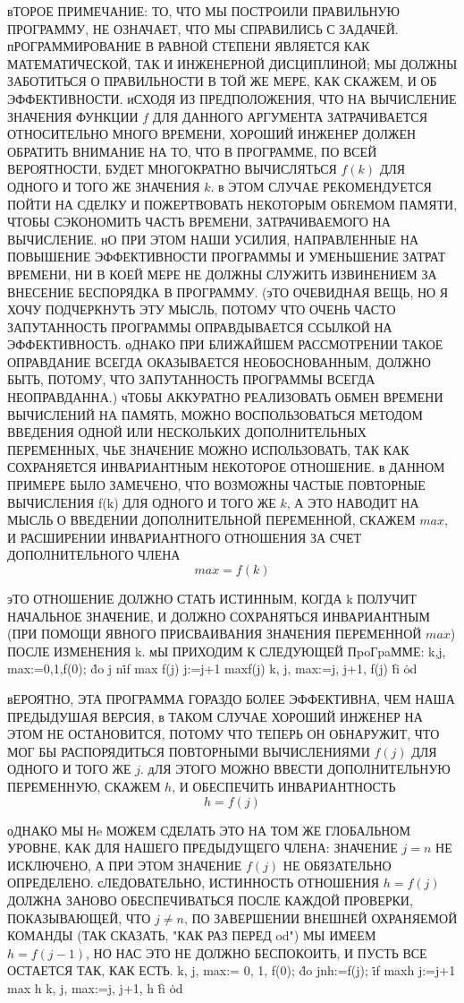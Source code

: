вТОРОЕ ПРИМЕЧАНИЕ: ТО, ЧТО МЫ ПОСТРОИЛИ ПРАВИЛЬНУЮ ПРОГРАММУ,
НЕ ОЗНАЧАЕТ, ЧТО МЫ СПРАВИЛИСЬ С ЗАДАЧЕЙ. пРОГРАММИРОВАНИЕ
В РАВНОЙ СТЕПЕНИ ЯВЛЯЕТСЯ КАК МАТЕМАТИЧЕСКОЙ, ТАК И ИНЖЕНЕРНОЙ
ДИСЦИПЛИНОЙ; МЫ ДОЛЖНЫ ЗАБОТИТЬСЯ О ПРАВИЛЬНОСТИ В ТОЙ
ЖЕ МЕРЕ, КАК СКАЖЕМ, И ОБ ЭФФЕКТИВНОСТИ. иСХОДЯ ИЗ
ПРЕДПОЛОЖЕНИЯ, ЧТО НА ВЫЧИСЛЕНИЕ ЗНАЧЕНИЯ ФУНКЦИИ $f$ 
ДЛЯ ДАННОГО АРГУМЕНТА ЗАТРАЧИВАЕТСЯ ОТНОСИТЕЛЬНО МНОГО ВРЕМЕНИ,
ХОРОШИЙ ИНЖЕНЕР ДОЛЖЕН ОБРАТИТЬ ВНИМАНИЕ НА ТО, ЧТО В
ПРОГРАММЕ, ПО ВСЕЙ ВЕРОЯТНОСТИ, БУДЕТ МНОГОКРАТНО ВЫЧИСЛЯТЬСЯ
$f(k)$ ДЛЯ ОДНОГО И ТОГО ЖЕ ЗНАЧЕНИЯ $k$. в ЭТОМ СЛУЧАЕ
РЕКОМЕНДУЕТСЯ ПОЙТИ НА СДЕЛКУ И ПОЖЕРТВОВАТЬ НЕКОТОРЫМ
ОБRЕМОМ ПАМЯТИ, ЧТОБЫ СЭКОНОМИТЬ ЧАСТЬ ВРЕМЕНИ, ЗАТРАЧИВАЕМОГО
НА ВЫЧИСЛЕНИЕ. нО ПРИ ЭТОМ НАШИ УСИЛИЯ, НАПРАВЛЕННЫЕ НА
ПОВЫШЕНИЕ ЭФФЕКТИВНОСТИ ПРОГРАММЫ И УМЕНЬШЕНИЕ
ЗАТРАТ ВРЕМЕНИ, НИ В КОЕЙ МЕРЕ НЕ ДОЛЖНЫ СЛУЖИТЬ ИЗВИНЕНИЕМ
ЗА ВНЕСЕНИЕ БЕСПОРЯДКА В ПРОГРАММУ. (эТО ОЧЕВИДНАЯ ВЕЩЬ, НО Я ХОЧУ
ПОДЧЕРКНУТЬ ЭТУ МЫСЛЬ, ПОТОМУ ЧТО ОЧЕНЬ ЧАСТО
ЗАПУТАННОСТЬ ПРОГРАММЫ ОПРАВДЫВАЕТСЯ ССЫЛКОЙ НА
ЭФФЕКТИВНОСТЬ. оДНАКО ПРИ БЛИЖАЙШЕМ РАССМОТРЕНИИ ТАКОЕ
ОПРАВДАНИЕ ВСЕГДА ОКАЗЫВАЕТСЯ НЕОБОСНОВАННЫМ, ДОЛЖНО БЫТЬ,
ПОТОМУ, ЧТО ЗАПУТАННОСТЬ ПРОГРАММЫ ВСЕГДА НЕОПРАВДАННА.)
чТОБЫ АККУРАТНО РЕАЛИЗОВАТЬ ОБМЕН ВРЕМЕНИ ВЫЧИСЛЕНИЙ НА
ПАМЯТЬ, МОЖНО ВОСПОЛЬЗОВАТЬСЯ МЕТОДОМ ВВЕДЕНИЯ ОДНОЙ ИЛИ
НЕСКОЛЬКИХ ДОПОЛНИТЕЛЬНЫХ ПЕРЕМЕННЫХ, ЧЬЕ ЗНАЧЕНИЕ МОЖНО
ИСПОЛЬЗОВАТЬ, ТАК КАК СОХРАНЯЕТСЯ ИНВАРИАНТНЫМ НЕКОТОРОЕ
ОТНОШЕНИЕ. в ДАННОМ ПРИМЕРЕ БЫЛО ЗАМЕЧЕНО, ЧТО ВОЗМОЖНЫ
ЧАСТЫЕ ПОВТОРНЫЕ ВЫЧИСЛЕНИЯ f(k) ДЛЯ ОДНОГО И ТОГО ЖЕ $k$, 
А ЭТО НАВОДИТ НА МЫСЛЬ О ВВЕДЕНИИ ДОПОЛНИТЕЛЬНОЙ 
ПЕРЕМЕННОЙ, СКАЖЕМ $max$, И РАСШИРЕНИИ ИНВАРИАНТНОГО ОТНОШЕНИЯ
ЗА СЧЕТ ДОПОЛНИТЕЛЬНОГО ЧЛЕНА
$$
max=f(k)
$$

эТО ОТНОШЕНИЕ ДОЛЖНО СТАТЬ ИСТИННЫМ, КОГДА k  ПОЛУЧИТ
НАЧАЛЬНОЕ ЗНАЧЕНИЕ, И ДОЛЖНО СОХРАНЯТЬСЯ ИНВАРИАНТНЫМ (ПРИ
ПОМОЩИ ЯВНОГО ПРИСВАИВАНИЯ ЗНАЧЕНИЯ ПЕРЕМЕННОЙ $max$) 
ПОСЛЕ ИЗМЕНЕНИЯ k. мЫ ПРИХОДИМ К СЛЕДУЮЩЕЙ ПpoГpaММЕ:
\prg
k,j, max:=0,1,f(0);
\.{do} j \NE n\to \.{if} max \GE f(j) \to j:=j+1
\wbox max\LE f(j) \to k, j, max:=j, j+1, f(j) \.{fi} \.{od}
\grp

вЕРОЯТНО, ЭТА ПРОГРАММА ГОРАЗДО БОЛЕЕ ЭФФЕКТИВНА, ЧЕМ
НАША ПРЕДЫДУШАЯ ВЕРСИЯ, в ТАКОМ СЛУЧАЕ ХОРОШИЙ ИНЖЕНЕР
НА ЭТОМ НЕ ОСТАНОВИТСЯ, ПОТОМУ ЧТО ТЕПЕРЬ ОН ОБНАРУЖИТ, ЧТО
МОГ БЫ РАСПОРЯДИТЬСЯ ПОВТОРНЫМИ ВЫЧИСЛЕНИЯМИ $f(j)$ ДЛЯ
ОДНОГО И ТОГО ЖЕ $j$. дЛЯ ЭТОГО МОЖНО ВВЕСТИ ДОПОЛНИТЕЛЬНУЮ
ПЕРЕМЕННУЮ, СКАЖЕМ $h$, И ОБЕСПЕЧИТЬ ИНВАРИАНТНОСТЬ
$$
h=f(j)
$$

оДНАКО МЫ Нe МОЖЕМ СДЕЛАТЬ ЭТО НА ТОМ ЖЕ ГЛОБАЛЬНОМ
УРОВНЕ, КАК ДЛЯ НАШЕГО ПРЕДЫДУЩЕГО ЧЛЕНА: ЗНАЧЕНИЕ $j=n$ НЕ
ИСКЛЮЧЕНО, А ПРИ ЭТОМ ЗНАЧЕНИЕ $f(j)$ НЕ ОБЯЗАТЕЛЬНО ОПРЕДЕЛЕНО.
сЛЕДОВАТЕЛЬНО, ИСТИННОСТЬ ОТНОШЕНИЯ $h=f(j)$ ДОЛЖНА
ЗАНОВО ОБЕСПЕЧИВАТЬСЯ ПОСЛЕ КАЖДОЙ ПРОВЕРКИ, ПОКАЗЫВАЮЩЕЙ,
ЧТО $j\not=n$, ПО ЗАВЕРШЕНИИ ВНЕШНЕЙ ОХРАНЯЕМОЙ КОМАНДЫ (ТАК
СКАЗАТЬ, "КАК РАЗ ПЕРЕД od") МЫ ИМЕЕМ $h=f(j-1)$, НО НАС ЭТО
НЕ ДОЛЖНО БЕСПОКОИТЬ, И ПУСТЬ ВСЕ ОСТАЕТСЯ ТАК, КАК ЕСТЬ.
\prg
k, j, max:= 0, 1, f(0);
\.{do} j\NE n\to h:=f(j);
         \.{if} max\GE h \to j:=j+1
\wbox max \LE h \to k, j, max:=j, j+1, h \.{fi} \.{od}
\grp

